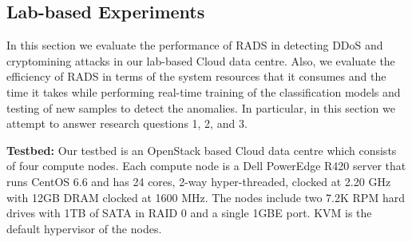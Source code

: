 \subsection{Lab-based Experiments}
\label{sec:realtime_analysis}
\noindent In this section we evaluate the performance of RADS in detecting DDoS and cryptomining attacks in our lab-based Cloud data centre. Also, we evaluate the efficiency of RADS in terms of the system resources that it consumes and the time it takes while performing real-time training of the classification models and testing of new samples to detect the anomalies.
In particular, in this section we attempt to answer research questions 1, 2, and 3.

\textbf{Testbed:} Our testbed is an OpenStack based Cloud data centre which consists of four compute nodes. Each compute node is a Dell PowerEdge R420 server that runs CentOS 6.6 and has 24 cores, 2-way hyper-threaded, clocked at 2.20 GHz with 12GB DRAM clocked at 1600 MHz. The nodes include two 7.2K RPM hard drives with 1TB of SATA in RAID 0 and a single 1GBE port. KVM is the default hypervisor of the nodes. 

